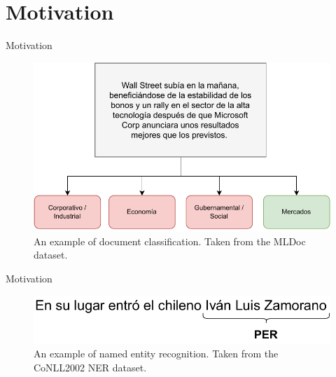 \documentclass[aspectratio=169,xcolor=dvipsnames]{beamer}
\begin{document}
\section{Motivation}
\begin{frame}{Motivation}

\centering
\begin{figure}
    \includegraphics[scale=0.65]{images/nlp-example-document-classification.pdf}
    \caption{An example of document classification. Taken from the MLDoc \citep{schwenk-li-2018-corpus} dataset.}
    \label{fig:nlp-example-document-classification}
\end{figure}

\end{frame}
\begin{frame}{Motivation}

\centering
\begin{figure}
    \includegraphics[scale=0.7]{images/nlp-example-ner.pdf}
    \caption{An example of named entity recognition. Taken from the CoNLL2002 NER \citep{tjong-kim-sang-2002-introduction} dataset.}
    \label{fig:nlp-example-ner}
\end{figure}

\end{frame}
\end{document}
